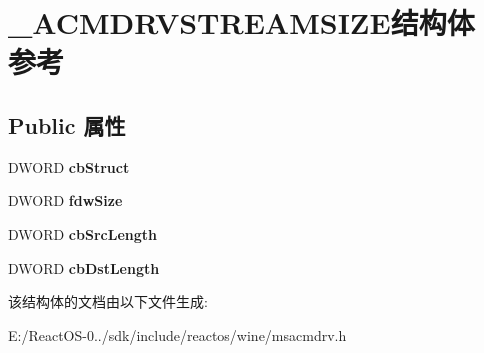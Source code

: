 \hypertarget{struct___a_c_m_d_r_v_s_t_r_e_a_m_s_i_z_e}{}\section{\+\_\+\+A\+C\+M\+D\+R\+V\+S\+T\+R\+E\+A\+M\+S\+I\+Z\+E结构体 参考}
\label{struct___a_c_m_d_r_v_s_t_r_e_a_m_s_i_z_e}
\subsection*{Public 属性}
\begin{DoxyCompactItemize}
\item 
\mbox{\label{struct___a_c_m_d_r_v_s_t_r_e_a_m_s_i_z_e_ad821c67505e01b4b7dba0f42d8abcfba}} 
D\+W\+O\+RD {\bfseries cb\+Struct}
\item 
\mbox{\label{struct___a_c_m_d_r_v_s_t_r_e_a_m_s_i_z_e_a69f7e1a92c49221e1fa6f8f3a6d8c969}} 
D\+W\+O\+RD {\bfseries fdw\+Size}
\item 
\mbox{\label{struct___a_c_m_d_r_v_s_t_r_e_a_m_s_i_z_e_af2220fc592ee92bafb35d9baf324ed8a}} 
D\+W\+O\+RD {\bfseries cb\+Src\+Length}
\item 
\mbox{\label{struct___a_c_m_d_r_v_s_t_r_e_a_m_s_i_z_e_af2fc588127d66fd70917f5d705d41bbd}} 
D\+W\+O\+RD {\bfseries cb\+Dst\+Length}
\end{DoxyCompactItemize}


该结构体的文档由以下文件生成\+:\begin{DoxyCompactItemize}
\item 
E\+:/\+React\+O\+S-\/0../sdk/include/reactos/wine/msacmdrv.\+h\end{DoxyCompactItemize}
